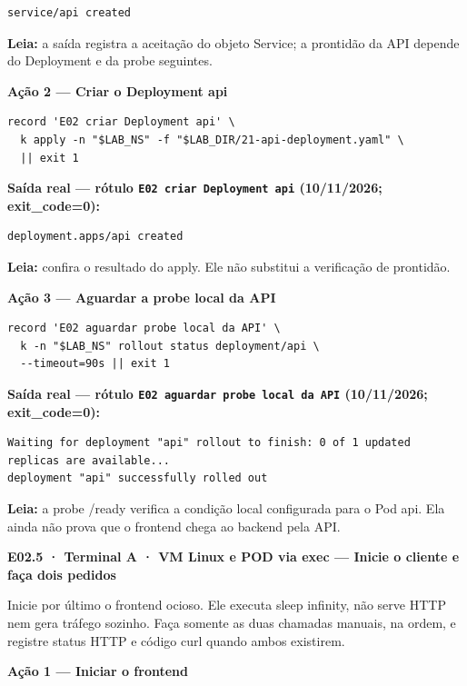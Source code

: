 \documentclass[12pt,openany,oneside,a4paper,chapter=TITLE,english,brazil]{abntex2}
\begin{document}
\begin{verbatim}
service/api created
\end{verbatim}

\textbf{Leia:} a saída registra a aceitação do objeto Service; a prontidão da API depende do Deployment e da probe seguintes.

\textbf{Ação 2 --- Criar o Deployment api}

\begin{verbatim}
record 'E02 criar Deployment api' \
  k apply -n "$LAB_NS" -f "$LAB_DIR/21-api-deployment.yaml" \
  || exit 1
\end{verbatim}

\textbf{Saída real --- rótulo \texttt{E02 criar Deployment api} (10/11/2026; exit\_code=0):}

\begin{verbatim}
deployment.apps/api created
\end{verbatim}

\textbf{Leia:} confira o resultado do apply. Ele não substitui a verificação de prontidão.

\textbf{Ação 3 --- Aguardar a probe local da API}

\begin{verbatim}
record 'E02 aguardar probe local da API' \
  k -n "$LAB_NS" rollout status deployment/api \
  --timeout=90s || exit 1
\end{verbatim}

\textbf{Saída real --- rótulo \texttt{E02 aguardar probe local da API} (10/11/2026; exit\_code=0):}

\begin{verbatim}
Waiting for deployment "api" rollout to finish: 0 of 1 updated replicas are available...
deployment "api" successfully rolled out
\end{verbatim}

\textbf{Leia:} a probe /ready verifica a condição local configurada para o Pod api. Ela ainda não prova que o frontend chega ao backend pela API.

\clearpage

\textbf{E02.5 · Terminal A · VM Linux e POD via exec --- Inicie o cliente e faça dois pedidos}

Inicie por último o frontend ocioso. Ele executa sleep infinity, não serve HTTP nem gera tráfego sozinho. Faça somente as duas chamadas manuais, na ordem, e registre status HTTP e código curl quando ambos existirem.

\textbf{Ação 1 --- Iniciar o frontend}
\end{document}
